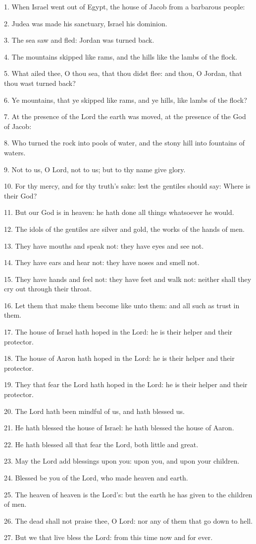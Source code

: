 1. When Israel went out of Egypt, the house of Jacob from a barbarous people:

2. Judea was made his sanctuary, Israel his dominion.

3. The sea saw and fled: Jordan was turned back.

4. The mountains skipped like rams, and the hills like the lambs of the flock.

5. What ailed thee, O thou sea, that thou didst flee: and thou, O Jordan, that thou wast turned back?

6. Ye mountains, that ye skipped like rams, and ye hills, like lambs of the flock?

7. At the presence of the Lord the earth was moved, at the presence of the God of Jacob:

8. Who turned the rock into pools of water, and the stony hill into fountains of waters.

9. Not to us, O Lord, not to us; but to thy name give glory.

10. For thy mercy, and for thy truth's sake: lest the gentiles should say: Where is their God?

11. But our God is in heaven: he hath done all things whatsoever he would.

12. The idols of the gentiles are silver and gold, the works of the hands of men.

13. They have mouths and speak not: they have eyes and see not.

14. They have ears and hear not: they have noses and smell not.

15. They have hands and feel not: they have feet and walk not: neither shall they cry out through their throat.

16. Let them that make them become like unto them: and all such as trust in them.

17. The house of Israel hath hoped in the Lord: he is their helper and their protector.

18. The house of Aaron hath hoped in the Lord: he is their helper and their protector.

19. They that fear the Lord hath hoped in the Lord: he is their helper and their protector.

20. The Lord hath been mindful of us, and hath blessed us.

21. He hath blessed the house of Israel: he hath blessed the house of Aaron.

22. He hath blessed all that fear the Lord, both little and great.

23. May the Lord add blessings upon you: upon you, and upon your children.

24. Blessed be you of the Lord, who made heaven and earth.

25. The heaven of heaven is the Lord's: but the earth he has given to the children of men.

26. The dead shall not praise thee, O Lord: nor any of them that go down to hell.

27. But we that live bless the Lord: from this time now and for ever.